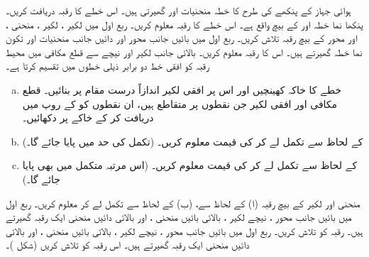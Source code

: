 ہوائی جہاز کے پنکھے کی طرح کا خطہ منحنیات   اور  گھیرتی ہیں۔ اس خطے کا رقبہ دریافت کریں۔
پنکھا نما خطہ  اور  کے بیچ  واقع  ہے۔ اس خطے کا رقبہ معلوم کریں۔
ربع اول میں لکیر ، لکیر ، منحنی ، اور  محور     کے بیچ رقبہ تلاش کریں۔
ربع اول میں بائیں جانب محور   اور دائیں جانب منحنیات  اور  تکون نما خطہ گھیرتے ہیں۔ اس کا رقبہ معلوم کریں۔
بالائی جانب لکیر  اور نیچے سے قطع مکافی   میں محیط رقبہ کو افقی خط  دو برابر ذیلی خطوں میں تقسیم کرتا ہے۔
\begin{enumerate}[a.]
\item
خطے کا خاکہ کھینچیں اور اس پر افقی لکیر  اندازاً درست مقام پر بنائیں۔ قطع مکافی اور افقی لکیر جن نقطوں پر متقاطع ہیں، ان نقطوں کو  کے  روپ میں دریافت کر کے خاکے پر دکھائیں۔
\item
{} کے لحاظ سے تکمل لے کر  کی قیمت معلوم کریں۔ (تکمل کی  حد میں  پایا جائے گا۔)
\item
{} کے لحاظ سے تکمل لے کر  کی قیمت معلوم کریں۔ (اس مرتبہ     متکمل میں بھی  پایا جائے گا۔)
\end{enumerate}
منحنی  اور لکیر  کے بیچ رقبہ (ا)  کے لحاظ سے، (ب)  کے لحاظ سے تکمل لے کر معلوم کریں۔
ربع اول میں بائیں جانب  محور ، نیچے لکیر ، بالائی بائیں منحنی ، اور بالائی دائیں منحنی  ایک رقبہ گھیرتے ہیں۔  رقبہ کو تلاش کریں۔
ربع اول میں بائیں جانب محور  ، نیچے لکیر ، بالائی بائیں منحنی ، اور بالائی دائیں
 منحنی  ایک رقبہ گھیرتے ہیں۔ اس رقبہ کو تلاش کریں (شکل )۔
